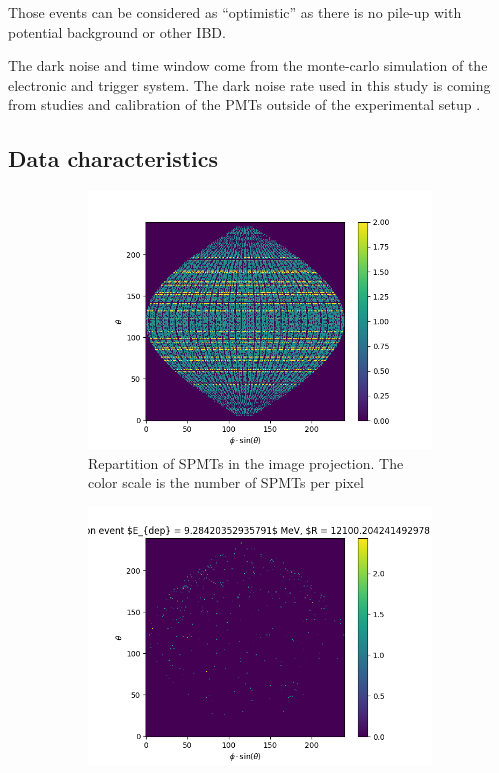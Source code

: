 Those events can be considered as ``optimistic'' as there is no pile-up with potential background or other IBD.

The dark noise and time window come from the monte-carlo simulation of the electronic and trigger system. The dark noise rate used in this study is coming from studies and calibration of the PMTs outside of the experimental setup \cite{cao_mass_2021, abusleme_mass_2022}.


\subsection{Data characteristics}

\begin{figure}[ht]
  \centering
  \begin{subfigure}[b]{0.48\textwidth}
    \centering
    \includegraphics[width=\textwidth]{images/jcnn/pmt_repartition.png}
    \caption{Repartition of SPMTs in the image projection. The color scale is the number of SPMTs per pixel}
    \label{fig:jcnn:pmt_rep}
  \end{subfigure}
  \hfill
  \begin{subfigure}[b]{0.48\textwidth}
    \centering
    \includegraphics[width=\textwidth]{images/jcnn/illustration_event.png}

\end{subfigure}
\end{figure}
